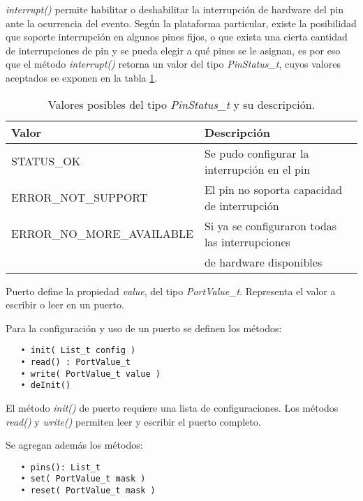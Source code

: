 \emph{interrupt()} permite habilitar o deshabilitar la interrupción de hardware del pin ante la ocurrencia del evento. Según la plataforma particular, existe la posibilidad que soporte interrupción en algunos pines fijos, o que exista una cierta cantidad de interrupciones de pin y se pueda elegir a qué pines se le asignan, es por eso que el método \emph{interrupt()} retorna un valor del tipo \emph{PinStatus\_t}, cuyos valores aceptados se exponen en la tabla \ref{tab:PinStatusT}. 

\begin{table}[h]
	\centering	
	\begin{tabular}{l l}   
		\toprule
		\textbf{Valor} & \textbf{Descripción} \\
		\midrule
		STATUS\_OK & Se pudo configurar la interrupción en el pin \\		
		ERROR\_NOT\_SUPPORT & El pin no soporta capacidad de interrupción \\
		ERROR\_NO\_MORE\_AVAILABLE & Si ya se configuraron todas las interrupciones\\
		 & de hardware disponibles \\
		\bottomrule
		\hline
	\end{tabular}
	\caption[Valores posibles del tipo \emph{PinStatus\_t}.]{Valores posibles del tipo \emph{PinStatus\_t} y su descripción.}
	\label{tab:PinStatusT}
\end{table}


Puerto define la propiedad \emph{value}, del tipo \emph{PortValue\_t}. Representa el valor a escribir o leer en un puerto.

Para la configuración y uso de un puerto se definen los métodos:

\begin{verbatim}
   • init( List_t config )
   • read() : PortValue_t
   • write( PortValue_t value )
   • deInit()
\end{verbatim}

El método \emph{init()} de puerto requiere una lista de configuraciones. Los métodos \emph{read()} y \emph{write()} permiten leer y escribir el puerto completo.

Se agregan además los métodos:

\begin{verbatim}
   • pins(): List_t
   • set( PortValue_t mask )
   • reset( PortValue_t mask )
\end{verbatim}

